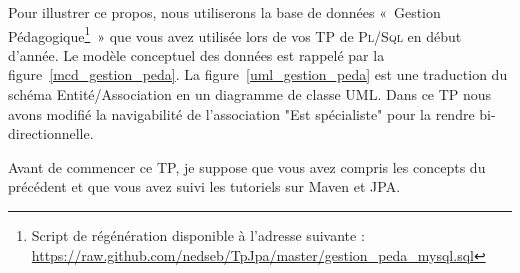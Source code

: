 \documentclass[a4paper,11pt]{article}
\begin{document}
Pour illustrer ce propos, nous utiliserons la base de données «~Gestion Pédagogique\footnote{Script de régénération disponible 
à l'adresse suivante : \url{https://raw.github.com/nedseb/TpJpa/master/gestion_peda_mysql.sql}}~» que vous avez utilisée lors de vos TP de \textsc{Pl/Sql} 
en début d'année. Le modèle conceptuel des données est rappelé par la figure~\ref{mcd_gestion_peda}. La figure~\ref{uml_gestion_peda} 
est une traduction du schéma Entité/Association en un  diagramme de classe UML. Dans ce TP nous avons modifié la 
navigabilité de l'association "Est spécialiste" pour la rendre bi-directionnelle.

Avant de commencer ce TP, je suppose que vous avez compris les concepts du précédent et que vous avez suivi les tutoriels 
sur Maven et JPA.

\begin{figure}[bp]\centering
{}
\end{figure}
\end{document}
